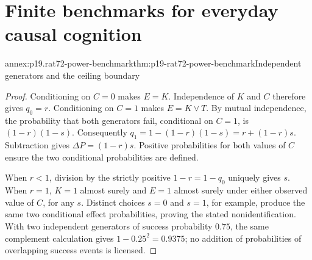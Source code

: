 \section{Finite benchmarks for everyday causal cognition}
\label{annex:p19-rat72-benchmarks}

\begin{annexitem}{annex:p19.rat72-power-benchmark}{thm:p19-rat72-power-benchmark}{Independent generators and the ceiling boundary}
\begin{proof}
Conditioning on \(C=0\) makes \(E=K\). Independence of \(K\) and
\(C\) therefore gives \(q_0=r\). Conditioning on \(C=1\) makes
\(E=K\lor T\). By mutual independence, the probability that both
generators fail, conditional on \(C=1\), is \((1-r)(1-s)\).
Consequently \(q_1=1-(1-r)(1-s)=r+(1-r)s\). Subtraction gives
\(\Delta P=(1-r)s\). Positive probabilities for both values of \(C\)
ensure the two conditional probabilities are defined.

When \(r<1\), division by the strictly positive \(1-r=1-q_0\)
uniquely gives \(s\). When \(r=1\), \(K=1\) almost surely and
\(E=1\) almost surely under either observed value of \(C\), for
any \(s\). Distinct choices \(s=0\) and \(s=1\), for example,
produce the same two conditional effect probabilities, proving the
stated nonidentification. With two independent generators of success
probability \(0.75\), the same complement calculation gives
\(1-0.25^2=0.9375\); no addition of probabilities of overlapping
success events is licensed.
\end{proof}
\end{annexitem}

